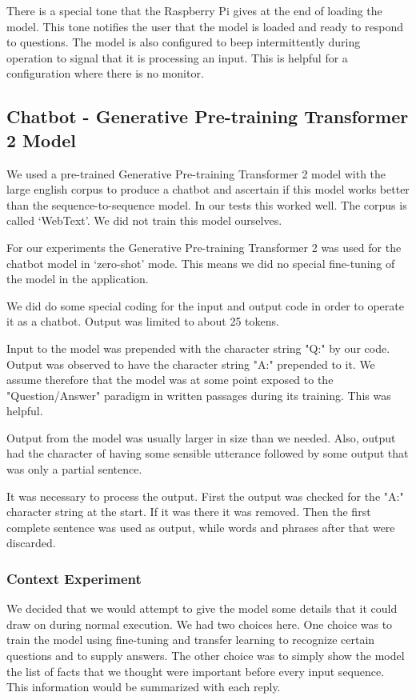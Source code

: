 There is a special tone that the Raspberry Pi gives at the end of loading the model. This tone notifies the user that the model is loaded and ready to respond to questions. The model is also configured to beep intermittently during operation to signal that it is processing an input. This is helpful for a configuration where there is no monitor.


\subsection{Chatbot - Generative Pre-training Transformer 2 Model}
We used a pre-trained Generative Pre-training Transformer 2 model with the large english corpus to produce a chatbot and ascertain if this model works better than the sequence-to-sequence model. In our tests this worked well. The corpus is called `WebText'. We did not train this model ourselves.

For our experiments the Generative Pre-training Transformer 2 was used for the chatbot model in `zero-shot' mode. This means we did no special fine-tuning of the model in the application.

We did do some special coding for the input and output code in order to operate it as a chatbot. Output was limited to about 25 tokens. 

Input to the model was prepended with the character string "Q:" by our code. Output was observed to have the character string "A:" prepended to it. We assume therefore that the model was at some point exposed to the "Question/Answer" paradigm in written passages during its training. This was helpful.

Output from the model was usually larger in size than we needed. Also, output had the character of having some sensible utterance followed by some output that was only a partial sentence.

It was necessary to process the output. First the output was checked for the "A:" character string at the start. If it was there it was removed. Then the first complete sentence was used as output, while words and phrases after that were discarded.

\subsubsection{Context Experiment}
We decided that we would attempt to give the model some details that it could draw on during normal execution. We had two choices here. One choice was to train the model using fine-tuning and transfer learning to recognize certain questions and to supply answers. The other choice was to simply show the model the list of facts that we thought were important before every input sequence. This information would be summarized with each reply.

